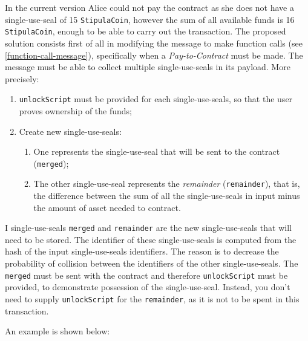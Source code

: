 In the current version Alice could not pay the contract as she does not have a single-use-seal of 15 
\verb|StipulaCoin|, however the sum of all available funds is 16 \verb|StipulaCoin|, enough to be able to 
carry out the transaction. The proposed solution consists first of all in modifying the message to make 
function calls (see \ref{function-call-message}), specifically when a \textit{Pay-to-Contract} must be 
made. The message must be able to collect multiple single-use-seals in its payload. More precisely:
\begin{enumerate}
  \item \verb|unlockScript| must be provided for each single-use-seals, so that the user proves ownership of 
  the funds;
  \item Create new single-use-seals:
  \begin{enumerate}
    \item One represents the single-use-seal that will be sent to the contract (\verb|merged|); %
    \item The other single-use-seal represents the \textit{remainder} (\verb|remainder|), that is, 
    the difference between the sum of all the single-use-seals in input minus the amount of asset needed to 
    contract. %
  \end{enumerate}
\end{enumerate} 

I single-use-seals \verb|merged| and \verb|remainder| are the new single-use-seals that will need to be 
stored. The identifier of these single-use-seals is computed from the hash of the input single-use-seals 
identifiers. The reason is to decrease the probability of collision between the identifiers of the other 
single-use-seals. The \verb|merged| must be sent with the contract and therefore \verb|unlockScript| must be 
provided, to demonstrate possession of the single-use-seal. Instead, you don't need to supply 
\verb|unlockScript| for the \verb|remainder|, as it is not to be spent in this transaction.

An example is shown below:


